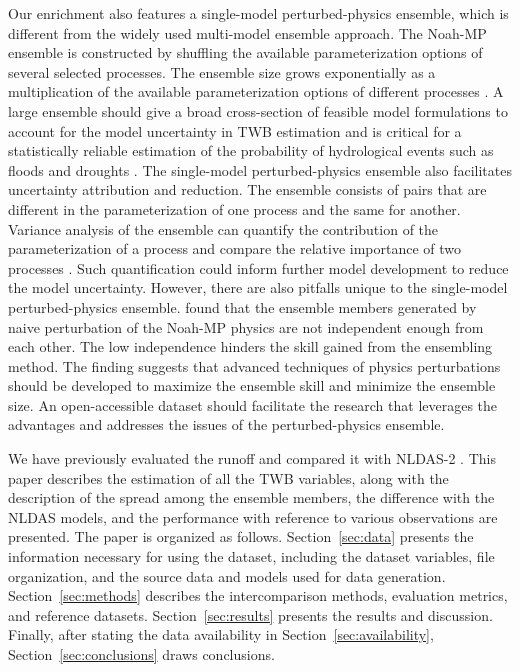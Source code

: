 \documentclass[essd, manuscript]{copernicus}
\begin{document}
Our enrichment also features a single-model perturbed-physics ensemble, which is different from the widely used multi-model ensemble approach. The Noah-MP ensemble is constructed by shuffling the available parameterization options of several selected processes. The ensemble size grows exponentially as a multiplication of the available parameterization options of different processes \citep{yang2011JGRA, zhang2016JGRA, gan2019WRR}. A large ensemble should give a broad cross-section of feasible model formulations to account for the model uncertainty in TWB estimation \citep{telteu2021GMD, mitchell2004JGRA} and is critical for a statistically reliable estimation of the probability of hydrological events such as floods and droughts \citep{troin2021WRR}. The single-model perturbed-physics ensemble also facilitates uncertainty attribution and reduction. The ensemble consists of pairs that are different in the parameterization of one process and the same for another. Variance analysis of the ensemble can quantify the contribution of the parameterization of a process and compare the relative importance of two processes \citep{zheng2019WRR, clark2011WRR}. Such quantification could inform further model development to reduce the model uncertainty. However, there are also pitfalls unique to the single-model perturbed-physics ensemble. \citet{fei2021WRR} found that the ensemble members generated by naive perturbation of the Noah-MP physics are not independent enough from each other. The low independence hinders the skill gained from the ensembling method. The finding suggests that advanced techniques of physics perturbations should be developed to maximize the ensemble skill and minimize the ensemble size. An open-accessible dataset should facilitate the research that leverages the advantages and addresses the issues of the perturbed-physics ensemble.

We have previously evaluated the runoff and compared it with NLDAS-2 \citep{fei2021WRR}. This paper describes the estimation of all the TWB variables, along with the description of the spread among the ensemble members, the difference with the NLDAS models, and the performance with reference to various observations are presented. The paper is organized as follows. Section~\ref{sec:data} presents the information necessary for using the dataset, including the dataset variables, file organization, and the source data and models used for data generation. Section~\ref{sec:methods} describes the intercomparison methods, evaluation metrics, and reference datasets. Section~\ref{sec:results} presents the results and discussion. Finally, after stating the data availability in Section~\ref{sec:availability}, Section~\ref{sec:conclusions} draws conclusions.
\end{document}
